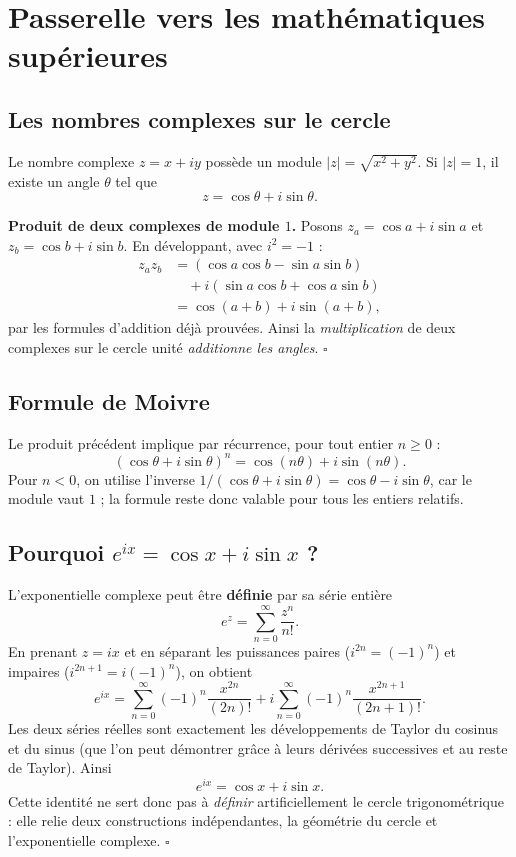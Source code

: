 \documentclass[../cours_spe_trigo.tex]{subfiles}
\begin{document}
\setcounter{chapter}{16}
\chapter{Passerelle vers les mathématiques supérieures}
\section{Les nombres complexes sur le cercle}
Le nombre complexe $z=x+iy$ possède un module $|z|=\sqrt{x^2+y^2}$. Si $|z|=1$, il existe un angle $\theta$ tel que
\[z=\cos\theta+i\sin\theta.\]
\begin{demonstration}
\textbf{Produit de deux complexes de module $1$.} Posons $z_a=\cos a+i\sin a$ et $z_b=\cos b+i\sin b$. En développant, avec $i^2=-1$ :
\[
\begin{aligned}
z_az_b&=(\cos a\cos b-\sin a\sin b)\\
&\quad+i(\sin a\cos b+\cos a\sin b)\\
&=\cos(a+b)+i\sin(a+b),
\end{aligned}
\]
par les formules d'addition déjà prouvées. Ainsi la \emph{multiplication} de deux complexes sur le cercle unité \emph{additionne les angles}. $\square$
\end{demonstration}
\section{Formule de Moivre}
Le produit précédent implique par récurrence, pour tout entier $n\ge0$ :
\[\boxed{(\cos\theta+i\sin\theta)^n=\cos(n\theta)+i\sin(n\theta).}\]
Pour $n<0$, on utilise l'inverse $1/(\cos\theta+i\sin\theta)=\cos\theta-i\sin\theta$, car le module vaut $1$ ; la formule reste donc valable pour tous les entiers relatifs.
\section{Pourquoi $e^{ix}=\cos x+i\sin x$ ?}
\begin{demonstration}
L'exponentielle complexe peut être \textbf{définie} par sa série entière
\[e^z=\sum_{n=0}^{\infty}\frac{z^n}{n!}.\]
En prenant $z=ix$ et en séparant les puissances paires ($i^{2n}=(-1)^n$) et impaires ($i^{2n+1}=i(-1)^n$), on obtient
\[
e^{ix}=\sum_{n=0}^{\infty}(-1)^n\frac{x^{2n}}{(2n)!}
+i\sum_{n=0}^{\infty}(-1)^n\frac{x^{2n+1}}{(2n+1)!}.
\]
Les deux séries réelles sont exactement les développements de Taylor du cosinus et du sinus (que l'on peut démontrer grâce à leurs dérivées successives et au reste de Taylor). Ainsi
\[\boxed{e^{ix}=\cos x+i\sin x.}\]
Cette identité ne sert donc pas à \emph{définir} artificiellement le cercle trigonométrique : elle relie deux constructions indépendantes, la géométrie du cercle et l'exponentielle complexe. $\square$
\end{demonstration}
\end{document}
